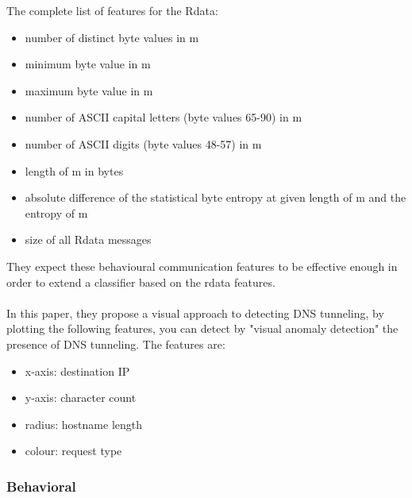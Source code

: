 The complete list of features for the Rdata:
\begin{itemize}[noitemsep]
\item number of distinct byte values in m
\item minimum byte value in m
\item maximum byte value in m
\item number of ASCII capital letters (byte values 65-90) in m
\item number of ASCII digits (byte values 48-57) in m
\item length of m in bytes
\item absolute difference of the statistical byte entropy at given length of m and the entropy of m
\item size of all Rdata messages
\end{itemize}
They expect these behavioural communication features to be effective enough in order to extend a classifier based on the rdata features.
\\\\
In this paper\cite{tunn}, they propose a visual approach to detecting DNS tunneling, by plotting the following features, you can detect by "visual anomaly detection" the presence of DNS tunneling. The features are:
\begin{itemize}[noitemsep]
\item x-axis: destination IP
\item y-axis: character count
\item radius: hostname length
\item colour: request type
\end{itemize}

\cite{dns-tun}


\subsubsection{Behavioral}




